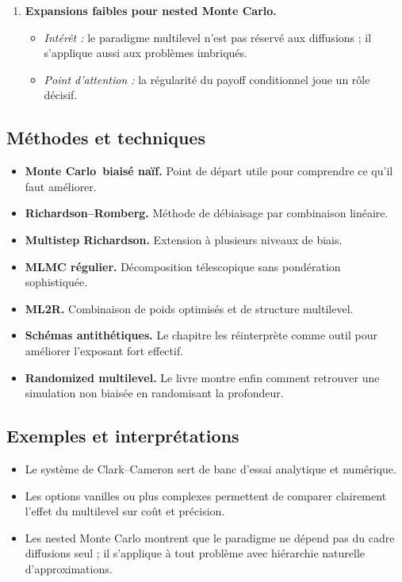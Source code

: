 \documentclass[11pt,a4paper]{article}
\newcommand{\mc}{Monte Carlo}
\begin{document}
\begin{enumerate}[label=\textbf{\arabic*.}]
  \item \textbf{Expansions faibles pour nested Monte Carlo.}
  \begin{itemize}
    \item \emph{Intérêt :} le paradigme multilevel n'est pas réservé aux diffusions ; il s'applique aussi aux problèmes imbriqués.
    \item \emph{Point d'attention :} la régularité du payoff conditionnel joue un rôle décisif.
  \end{itemize}
\end{enumerate}

\subsection{Méthodes et techniques}

\begin{itemize}
  \item \textbf{\mc\ biaisé naïf.} Point de départ utile pour comprendre ce qu'il faut améliorer.
  \item \textbf{Richardson--Romberg.} Méthode de débiaisage par combinaison linéaire.
  \item \textbf{Multistep Richardson.} Extension à plusieurs niveaux de biais.
  \item \textbf{MLMC régulier.} Décomposition télescopique sans pondération sophistiquée.
  \item \textbf{ML2R.} Combinaison de poids optimisés et de structure multilevel.
  \item \textbf{Schémas antithétiques.} Le chapitre les réinterprète comme outil pour améliorer l'exposant fort effectif.
  \item \textbf{Randomized multilevel.} Le livre montre enfin comment retrouver une simulation non biaisée en randomisant la profondeur.
\end{itemize}

\subsection{Exemples et interprétations}

\begin{itemize}
  \item Le système de Clark--Cameron sert de banc d'essai analytique et numérique.
  \item Les options vanilles ou plus complexes permettent de comparer clairement l'effet du multilevel sur coût et précision.
  \item Les nested Monte Carlo montrent que le paradigme ne dépend pas du cadre diffusions seul ; il s'applique à tout problème avec hiérarchie naturelle d'approximations.
\end{itemize}
\end{document}
